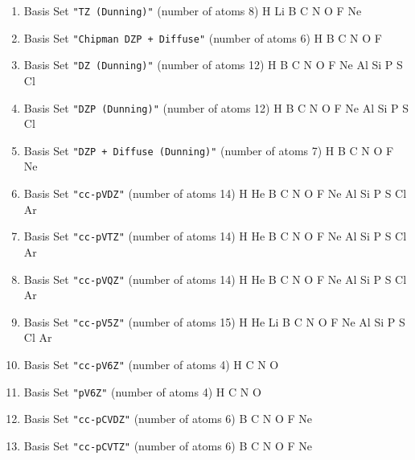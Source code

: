 \begin{enumerate}
\item Basis Set \verb#"TZ (Dunning)"# (number of atoms 8) \newline
  H Li B C N O F Ne


\item Basis Set \verb#"Chipman DZP + Diffuse"# (number of atoms 6) \newline
  H B C N O F


\item Basis Set \verb#"DZ (Dunning)"# (number of atoms 12) \newline
  H B C N O F Ne Al Si P S Cl


\item Basis Set \verb#"DZP (Dunning)"# (number of atoms 12) \newline
  H B C N O F Ne Al Si P S Cl


\item Basis Set \verb#"DZP + Diffuse (Dunning)"# (number of atoms 7) \newline
  H B C N O F Ne


\item Basis Set \verb#"cc-pVDZ"# (number of atoms 14) \newline
  H He B C N O F Ne Al Si P S Cl Ar


\item Basis Set \verb#"cc-pVTZ"# (number of atoms 14) \newline
  H He B C N O F Ne Al Si P S Cl Ar


\item Basis Set \verb#"cc-pVQZ"# (number of atoms 14) \newline
  H He B C N O F Ne Al Si P S Cl Ar


\item Basis Set \verb#"cc-pV5Z"# (number of atoms 15) \newline
  H He Li B C N O F Ne Al Si P S Cl Ar


\item Basis Set \verb#"cc-pV6Z"# (number of atoms 4) \newline
  H C N O


\item Basis Set \verb#"pV6Z"# (number of atoms 4) \newline
  H C N O


\item Basis Set \verb#"cc-pCVDZ"# (number of atoms 6) \newline
  B C N O F Ne


\item Basis Set \verb#"cc-pCVTZ"# (number of atoms 6) \newline
  B C N O F Ne



\end{enumerate}
